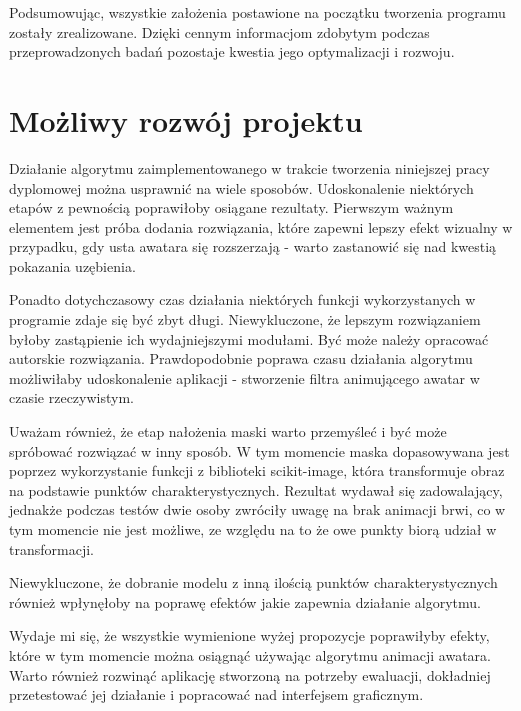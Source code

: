 Podsumowując, wszystkie założenia postawione na początku tworzenia programu zostały zrealizowane. Dzięki cennym informacjom zdobytym podczas przeprowadzonych badań pozostaje kwestia jego optymalizacji i rozwoju.

\section{Możliwy rozwój projektu}
Działanie algorytmu zaimplementowanego w trakcie tworzenia niniejszej pracy dyplomowej można usprawnić na wiele sposobów. Udoskonalenie niektórych etapów z pewnością poprawiłoby osiągane rezultaty. Pierwszym ważnym elementem jest próba dodania rozwiązania, które zapewni lepszy efekt wizualny w przypadku, gdy usta awatara się rozszerzają - warto zastanowić się nad kwestią pokazania uzębienia.

Ponadto dotychczasowy czas działania niektórych funkcji wykorzystanych w programie zdaje się być zbyt długi. Niewykluczone, że lepszym rozwiązaniem byłoby zastąpienie ich wydajniejszymi modułami. Być może należy opracować autorskie rozwiązania. Prawdopodobnie poprawa czasu działania algorytmu możliwiłaby udoskonalenie aplikacji - stworzenie filtra animującego awatar w czasie rzeczywistym.

Uważam również, że etap nałożenia maski warto przemyśleć i być może spróbować rozwiązać w inny sposób. W tym momencie maska dopasowywana jest poprzez wykorzystanie funkcji z biblioteki scikit-image, która transformuje obraz na podstawie punktów charakterystycznych. Rezultat wydawał się zadowalający, jednakże podczas testów dwie osoby zwróciły uwagę na brak animacji brwi, co w tym momencie nie jest możliwe, ze względu na to że owe punkty biorą udział w transformacji.

Niewykluczone, że dobranie modelu z inną ilością punktów charakterystycznych również wpłynęłoby na poprawę efektów jakie zapewnia działanie algorytmu.

Wydaje mi się, że wszystkie wymienione wyżej propozycje poprawiłyby efekty, które w tym momencie można osiągnąć używając algorytmu animacji awatara. Warto również rozwinąć aplikację stworzoną na potrzeby ewaluacji, dokładniej przetestować jej działanie i popracować nad interfejsem graficznym.